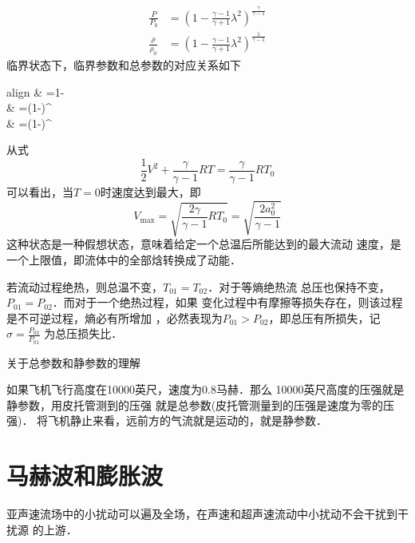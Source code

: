 \begin{enumerate}
\begin{equation}
		      \begin{split}
			      \frac{P}{P_0}        & =
			      \left(1-\frac{\gamma-1 }{\gamma+1 }\lambda^2\right)^{\frac{\gamma}{\gamma-1}} \\
			      \frac{\rho}{\rho_0 } & =
			      \left(1-\frac{\gamma-1 }{\gamma+1 }\lambda^2\right)^{
			      \frac{1}{\gamma-1}
			      }
		      \end{split}
		      \label{eq:13}
	      \end{equation}
	      临界状态下，临界参数和总参数的对应关系如下
	      \begin{empheq}[box=\widefbox]{align}
		               & =1-                                         \\
		              & =\left(1-\right)^{} \\
		       & =\left(1-\right)^{}
	      \end{empheq}
	      从式
	      \[
		      \frac{1}{2 }V^2+\frac{\gamma}{\gamma-1 }RT=\frac{\gamma}{\gamma-1 }RT_{0}
	      \]
	      可以看出，当$T=0 $时速度达到最大，即
	      \[
		      V_{\max}=\sqrt{\frac{2\gamma}{\gamma-1 }RT_0}=\sqrt{\frac{2a_0^2}{\gamma-1 }}
	      \]
	      这种状态是一种假想状态，意味着给定一个总温后所能达到的最大流动
	      速度，是一个上限值，即流体中的全部焓转换成了动能．

	      若流动过程绝热，则总温不变，$T_{01}=T_{02}$．对于等熵绝热流
	      总压也保持不变，$P_{01}=P_{02}$．而对于一个绝热过程，如果
	      变化过程中有摩擦等损失存在，则该过程是不可逆过程，熵必有所增加
	      ，必然表现为$P_{01}>P_{02}$，即总压有所损失，记$\sigma=\frac{P_{02}}{P_{01}}$
	      为总压损失比．
\end{enumerate}

\begin{notice}
	关于总参数和静参数的理解

	如果飞机飞行高度在10000英尺，速度为0.8马赫．那么
	10000英尺高度的压强就是静参数，用皮托管测到的压强
	就是总参数(皮托管测量到的压强是速度为零的压强)．
	将飞机静止来看，远前方的气流就是运动的，就是静参数．
\end{notice}

\section{马赫波和膨胀波}
亚声速流场中的小扰动可以遍及全场，在声速和超声速流动中小扰动不会干扰到干扰源
的上游．

